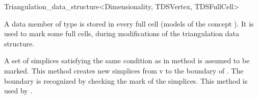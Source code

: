 \begin{ccRefClass}{Triangulation_data_structure<Dimensionality, TDSVertex, TDSFullCell>}
\begin{ccAdvanced}
\ccTypes

{A data member of type  is stored in every full cell (models
of the concept ).  It is used to mark some full
cells, during modifications of the triangulation data structure.}


{A set  of simplices satisfying the same condition as in method
\ccRefName{} is assumed to be marked. This
method creates new simplices from  v to the boundary of .
The boundary is recognized by checking the mark of the simplices.
This method is used by \ccRefName{}.}

\end{ccAdvanced}

\end{ccRefClass}

